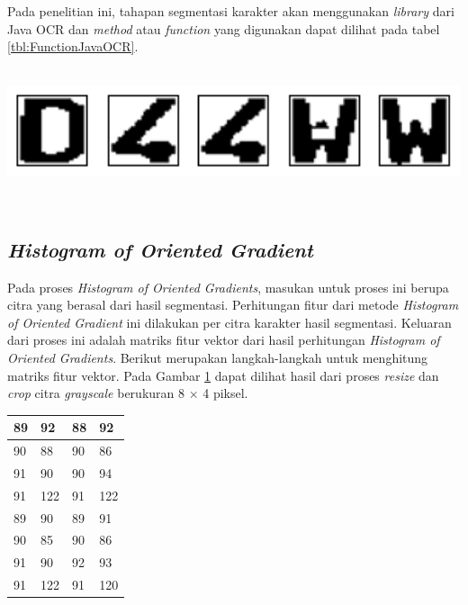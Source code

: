 \noindent Pada penelitian ini, tahapan segmentasi karakter akan menggunakan \textit{library} dari Java OCR dan \textit{method} atau \textit{function} yang digunakan dapat dilihat pada tabel \ref{tbl:FunctionJavaOCR}.\\
\\
\begin{adjustbox}{width=1\textwidth}
	\noindent\begin{minipage}{\linewidth}
		\centering\includegraphics[width=14cm]{images/OutputSegmentasi.png}
		\label{fig:OutputSegmentasi}
	\end{minipage}
\end{adjustbox}\\

\subsection{\textit{Histogram of Oriented Gradient}}
\noindent Pada proses \textit{Histogram of Oriented Gradients}, masukan untuk proses ini berupa citra yang berasal dari hasil segmentasi. Perhitungan fitur dari metode \textit{Histogram of Oriented Gradient} ini dilakukan per citra karakter hasil segmentasi. Keluaran dari proses ini adalah matriks fitur vektor dari hasil perhitungan \textit{Histogram of Oriented Gradients}. Berikut merupakan langkah-langkah untuk menghitung matriks fitur vektor. Pada Gambar \ref{fig:MatriksCitraHasilPreprocessing} dapat dilihat hasil dari proses \textit{resize} dan \textit{crop} citra \textit{grayscale} berukuran 8 $\times$ 4 piksel.

\begin{table}[H]
	\centering
	\begin{small}
		\begin{tabular}{|p{2cm}|p{2cm}|p{2cm}|p{2cm}|}
			\hline
			89 & 92 & 88 & 92 \\
			\hline
			90 & 88 & 90 & 86 \\
			\hline
			91 & 90 & 90 & 94 \\
			\hline
			91 & 122 & 91 & 122 \\
			\hline
			89 & 90 & 89 & 91 \\
			\hline
			90 & 85 & 90 & 86 \\
			\hline
			91 & 90 & 92 & 93 \\
			\hline
			91 & 122 & 91 & 120 \\
			\hline
		\end{tabular}
	\end{small}
	\label{fig:MatriksCitraHasilPreprocessing}
\end{table}


